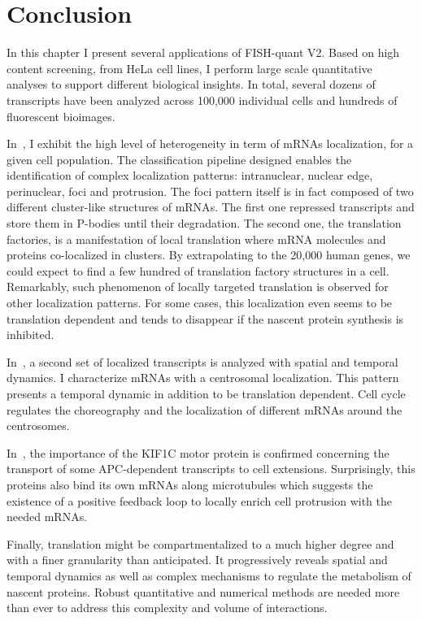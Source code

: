 \section{Conclusion}
\label{sec:conclusion_chapter5}

In this chapter I present several applications of FISH-quant V2.
Based on high content screening, from HeLa cell lines, I perform large scale quantitative analyses to support different biological insights.
In total, several dozens of transcripts have been analyzed across 100,000 individual cells and hundreds of fluorescent bioimages.

In~\cite{CHOUAIB_2020}, I exhibit the high level of heterogeneity in term of \ac{mRNA}s localization, for a given cell population.
The classification pipeline designed enables the identification of complex localization patterns: intranuclear, nuclear edge, perinuclear, foci and protrusion.
The foci pattern itself is in fact composed of two different cluster-like structures of \ac{mRNA}s.
The first one repressed transcripts and store them in \ac{P-bodies} until their degradation.
The second one, the translation factories, is a manifestation of local translation where \ac{mRNA} molecules and proteins co-localized in clusters.
By extrapolating to the 20,000 human genes, we could expect to find a few hundred of translation factory structures in a cell.
Remarkably, such phenomenon of locally targeted translation is observed for other localization patterns.
For some cases, this localization even seems to be translation dependent and tends to disappear if the nascent protein synthesis is inhibited.

In~\cite{safieddine_choreography_2021}, a second set of localized transcripts is analyzed with spatial and temporal dynamics.
I characterize \ac{mRNA}s with a centrosomal localization.
This pattern presents a temporal dynamic in addition to be translation dependent.
Cell cycle regulates the choreography and the localization of different \ac{mRNA}s around the centrosomes.

In~\cite{pichon_kinesin_2021}, the importance of the KIF1C motor protein is confirmed concerning the transport of some APC-dependent transcripts to cell extensions.
Surprisingly, this proteins also bind its own \ac{mRNA}s along microtubules which suggests the existence of a positive feedback loop to locally enrich cell protrusion with the needed \ac{mRNA}s.

Finally, translation might be compartmentalized to a much higher degree and with a finer granularity than anticipated.
It progressively reveals spatial and temporal dynamics as well as complex mechanisms to regulate the metabolism of nascent proteins.
Robust quantitative and numerical methods are needed more than ever to address this complexity and volume of interactions.